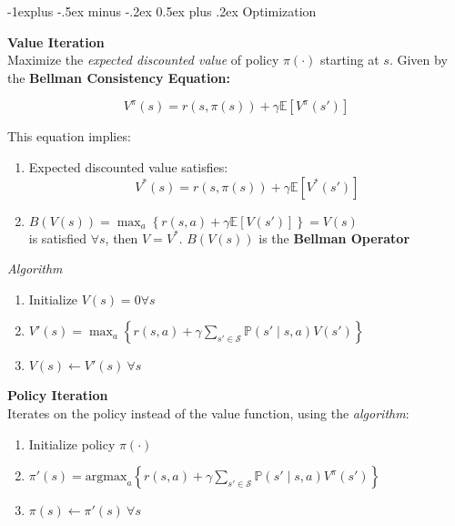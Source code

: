 \documentclass[10pt,landscape]{article}
\makeatletter
\newcommand{\p}{\mathbb{P}}
\newcommand{\E}{\mathbb{E}}
\renewcommand{\subsection}{\@startsection{subsection}{2}{0mm}%
                                {-1explus -.5ex minus -.2ex}%
                                {0.5ex plus .2ex}%
                                {\normalfont\normalsize\bfseries}}
\makeatother
\begin{document}
\begin{multicols*}{3}
	\subsection{Optimization}
	\begin{minipage}{\linewidth}
		\centering
	\end{minipage} \vspace{-0.25 cm}

	\textbf{Value Iteration}\\

	Maximize the \textit{expected discounted value} of policy $\pi(\cdot)$ starting at $s$. Given by the \textbf{Bellman Consistency Equation:}

	\begin{equation}\label{eq:bell}V^{\pi}(s) = r(s, \pi(s)) + \gamma \E[V^{\pi}(s')]\end{equation}

	This equation implies:
	\begin{enumerate}
		\item Expected discounted value satisfies:
		      $$V^{*}(s) = r(s, \pi(s)) + \gamma \E[V^{*}(s')]$$
		\item $B(V(s)) = \max_{a}\left\{r(s, a) + \gamma \E[V(s')] \right\} = V(s)$\\
		      is satisfied $\forall s$, then $V = V^{*}$. $B(V(s))$ is the \textbf{Bellman Operator}
	\end{enumerate}

	\textit{Algorithm}

	\begin{enumerate}
		\item Initialize $V(s) = 0 \forall s$
		\item $V'(s) = \max_{a}\left\{ r(s, a) + \gamma \sum_{s' \in \mathcal{S}} \p(s' \mid s, a) V(s') \right\}$
		\item $V(s) \leftarrow V'(s) \ \forall s$
	\end{enumerate}

	\textbf{Policy Iteration}\\
	Iterates on the policy instead of the value function, using the \textit{algorithm}:

	\begin{enumerate}
		\item Initialize policy $\pi(\cdot)$
		\item $\pi'(s) = \text{argmax}_{a}\left\{ r(s, a) + \gamma \sum_{s' \in \mathcal{S}} \p(s' \mid s, a) V^{\pi}(s') \right\}$
		\item $\pi(s) \leftarrow \pi'(s) \ \forall s$
	\end{enumerate}


\end{multicols*}
\end{document}

